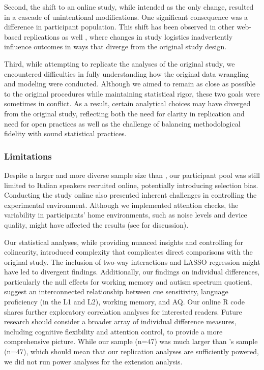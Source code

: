 Second, the shift to an online study, while intended as the only change, resulted in a cascade of unintentional modifications. One significant consequence was a difference in participant population. This shift has been observed in other web-based replications as well \citep{bramlett_wiener_24-AOW}, where changes in study logistics inadvertently influence outcomes in ways that diverge from the original study design.

Third, while attempting to replicate the analyses of the original study, we encountered difficulties in fully understanding how the original data wrangling and modeling were conducted. Although we aimed to remain as close as possible to the original procedures while maintaining statistical rigor, these two goals were sometimes in conflict. As a result, certain analytical choices may have diverged from the original study, reflecting both the need for clarity in replication and need for open practices as well as the challenge of balancing methodological fidelity with sound statistical practices.

\subsubsection{Limitations}

Despite a larger and more diverse sample size than \cite{Sulpizio_McQueen_2012}, our participant pool was still limited to Italian speakers recruited online, potentially introducing selection bias. Conducting the study online also presented inherent challenges in controlling the experimental environment. Although we implemented attention checks, the variability in participants' home environments, such as noise levels and device quality, might have affected the results (see \cite{bramlett_wiener_24-AOW} for discussion).

Our statistical analyses, while providing nuanced insights and controlling for colinearity, introduced complexity that complicates direct comparisons with the original study. The inclusion of two-way interactions and LASSO regression might have led to divergent findings. Additionally, our findings on individual differences, particularly the null effects for working memory and autism spectrum quotient, suggest an interconnected relationship between cue sensitivity, language proficiency (in the L1 and L2), working memory, and AQ. Our online R code shares further exploratory correlation analyses for interested readers. Future research should consider a broader array of individual difference measures, including cognitive flexibility and attention control, to provide a more comprehensive picture. While our sample (n=47) was much larger than \cite{Sulpizio_McQueen_2012}'s sample (n=47), which should mean that our replication analyses are sufficiently powered, we did not run power analyses for the extension analysis.

